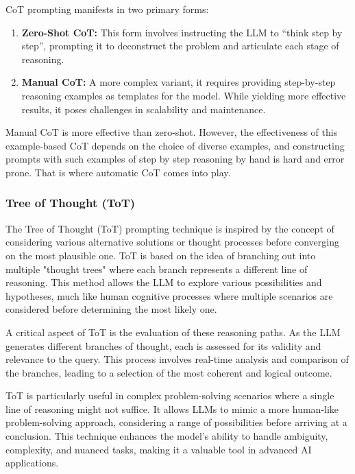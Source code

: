 \documentclass[conference]{IEEEtran}
\begin{document}
CoT prompting manifests in two primary forms:
\begin{enumerate}
    \item \textbf{Zero-Shot CoT:} This form involves instructing the LLM to ``think step by step'', prompting it to deconstruct the problem and articulate each stage of reasoning.
    \item \textbf{Manual CoT:} A more complex variant, it requires providing step-by-step reasoning examples as templates for the model. While yielding more effective results, it poses challenges in scalability and maintenance.
\end{enumerate}

Manual CoT is more effective than zero-shot. However, the effectiveness of this example-based CoT depends on the choice of diverse examples, and constructing prompts with such examples of step by step reasoning by hand is hard and error prone. That is where automatic CoT \cite{zhang2022automaticCOT} comes into play.


\subsubsection{Tree of Thought (ToT)}
The Tree of Thought (ToT) \cite{yao2023tree} prompting technique is inspired by the concept of considering various alternative solutions or thought processes before converging on the most plausible one.
ToT is based on the idea of branching out into multiple "thought trees" where each branch represents a different line of reasoning. This method allows the LLM to explore various possibilities and hypotheses, much like human cognitive processes where multiple scenarios are considered before determining the most likely one.

A critical aspect of ToT is the evaluation of these reasoning paths. As the LLM generates different branches of thought, each is assessed for its validity and relevance to the query. This process involves real-time analysis and comparison of the branches, leading to a selection of the most coherent and logical outcome.

ToT is particularly useful in complex problem-solving scenarios where a single line of reasoning might not suffice. It allows LLMs to mimic a more human-like problem-solving approach, considering a range of possibilities before arriving at a conclusion. This technique enhances the model's ability to handle ambiguity, complexity, and nuanced tasks, making it a valuable tool in advanced AI applications.
\end{document}
